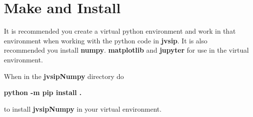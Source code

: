 \documentclass[11pt, oneside]{article}
\begin{document}
\section*{Make and Install}
It is recommended you create a virtual python environment and work in that environment when working with the python code in \textbf{jvsip}.  It is also recommended you install \textbf{numpy}. \textbf{matplotlib} and \textbf{jupyter} for use in the virtual environment.

When in the \textbf{jvsipNumpy} directory do

\textbf{python -m pip install .}

to install \textbf{jvsipNumpy} in your virtual environment.


 
\end{document}
